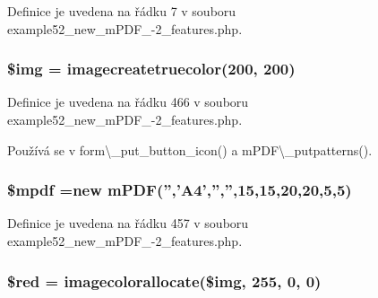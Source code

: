 Definice je uvedena na řádku 7 v souboru example52\-\_\-new\-\_\-m\-P\-D\-F\-\_-\/2\-\_\-features.\-php.

\hypertarget{example52__new__m_p_d_f__4-2__features_8php_a56a9a0da0c26b3d3029cea47a6b9292f}{
\subsubsection[{\$img}]{\setlength{\rightskip}{0pt plus 5cm}\$img = imagecreatetruecolor(200, 200)}}\label{example52__new__m_p_d_f__4-2__features_8php_a56a9a0da0c26b3d3029cea47a6b9292f}


Definice je uvedena na řádku 466 v souboru example52\-\_\-new\-\_\-m\-P\-D\-F\-\_-\/2\-\_\-features.\-php.



Používá se v form\textbackslash{}\-\_\-put\-\_\-button\-\_\-icon() a m\-P\-D\-F\textbackslash{}\-\_\-putpatterns().

\hypertarget{example52__new__m_p_d_f__4-2__features_8php_ad028f81910d6cbab9b184d2214b3a8f8}{
\subsubsection[{\$mpdf}]{\setlength{\rightskip}{0pt plus 5cm}\$mpdf =new {\bf m\-P\-D\-F}('','A4','','',15,15,20,20,5,5)}}\label{example52__new__m_p_d_f__4-2__features_8php_ad028f81910d6cbab9b184d2214b3a8f8}


Definice je uvedena na řádku 457 v souboru example52\-\_\-new\-\_\-m\-P\-D\-F\-\_-\/2\-\_\-features.\-php.

\hypertarget{example52__new__m_p_d_f__4-2__features_8php_a0c71b871217619e76a5a8d8594d1aff5}{
\subsubsection[{\$red}]{\setlength{\rightskip}{0pt plus 5cm}\$red = imagecolorallocate(\$img, 255, 0, 0)}}\label{example52__new__m_p_d_f__4-2__features_8php_a0c71b871217619e76a5a8d8594d1aff5}



